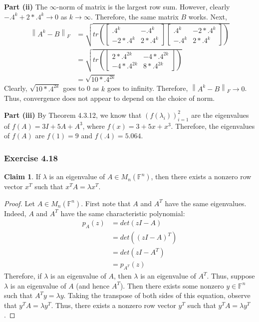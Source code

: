 \documentclass[letterpaper,12pt]{article}
\theoremstyle{definition}
\newtheorem{claim}[theorem]{Claim}
\newcommand{\norm}[1]{\left\lVert#1\right\rVert}
\begin{document}
\noindent\textbf{Part (ii)}
The $\infty$-norm of matrix is the largest row sum. However, clearly $-.4^k  + 2 * .4^k \to 0$ as $k \to \infty$. Therefore, the same matrix $B$ works. Next, 
\begin{align*}
	\norm{A^k - B}_F &= 
	\sqrt{tr\left( 
	\begin{bmatrix}
	.4^k &  -.4^k \\
	-2 * .4^k & 2 * .4^k
	\end{bmatrix}
	\begin{bmatrix}
	.4^k & -2 * .4^k \\
	-.4^k & 2 * .4^k
	\end{bmatrix}
	\right)} \\
	&= \sqrt{tr\left(
	\begin{bmatrix}
	2 * .4^{2k} & -4 * .4^{2k} \\
	-4 * .4^{2k} & 8 * .4^{2k}
	\end{bmatrix}
	\right)} \\
	&= \sqrt{10 * .4^{2k}}
\end{align*}
Clearly, $\sqrt{10 * .4^{2k}}$ goes to 0 as $k$ goes to infinity. Therefore, $\norm{A^k - B}_F \to 0$. Thus, convergence does not appear to depend on the choice of norm. 

\noindent\textbf{Part (iii)}
By Theorem 4.3.12, we know that $(f(\lambda_i))_{i=1}^2$ are the eigenvalues of $f(A) = 3I + 5A + A^3$, where $f(x) = 3 + 5x + x^3$. Therefore, the eigenvalues of $f(A)$ are $f(1) = 9$ and $f(.4) = 5.064$. 

\subsubsection*{Exercise 4.18}
\begin{claim}
	If $\lambda$  is an eigenvalue of $A \in M_n (\mathbb{F}^n)$, then there exists a nonzero row vector $x^T$ such that $x^TA = \lambda x^T$. 
\end{claim}
\begin{proof}
	Let $A \in M_n (\mathbb{F}^n)$. First note that $A$ and $A^T$ have the same eigenvalues. Indeed, $A$ and $A^T$ have the same characteristic polynomial:
	\begin{align*}
	p_A(z) &= det(zI - A) \\
				&= det((zI - A)^T) \\
				&= det(zI - A^T)  \\
				&= p_{A^T} (z)
	\end{align*}
	Therefore, if $\lambda$ is an eigenvalue of $A$, then $\lambda$ is an eigenvalue of $A^T$. Thus, suppose $\lambda$ is an eigenvalue of $A$ (and hence $A^T$). Then there exists some nonzero $y \in \mathbb{F}^n$ such that $A^Ty = \lambda y$. Taking the transpose of both sides of this equation, observe that $y^TA = \lambda y^T$. Thus, there exists a nonzero row vector $y^T$ such that $y^TA = \lambda y^T$. 
\end{proof}
\end{document}
